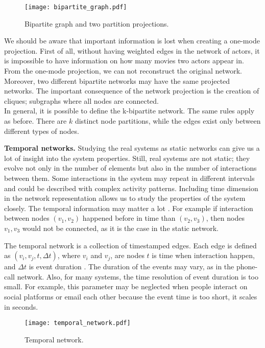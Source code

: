 \begin{figure}[H]
	\centering
	\texttt{[image: bipartite\_graph.pdf]} 
	\caption{Bipartite graph and two partition projections.}
	\label{fig:gt2}
\end{figure}

We should be aware that important information is lost when creating a one-mode projection. First of all, without having weighted edges in the network of actors, it is impossible to have information on how many movies two actors appear in. From the one-mode projection, we can not reconstruct the original network. Moreover, two different bipartite networks may have the same projected networks. The important consequence of the network projection is the creation of cliques; subgraphs where all nodes are connected. \\
In general, it is possible to define the k-bipartite network. The same rules apply as before. There are $k$ distinct node partitions, while the edges exist only between different types of nodes.

\textbf{Temporal networks.}
Studying the real systems as static networks can give us a lot of insight into the system properties. Still, real systems are not static; they evolve not only in the number of elements but also in the number of interactions between them. Some interactions in the system may repeat in different intervals and could be described with complex activity patterns. Including time dimension in the network representation allows us to study the properties of the system closely. The temporal information may matter a lot \cite{holme2012}. For example if interaction between nodes $(v_1, v_2)$ happened before in time than  $(v_2, v_3)$, then nodes $v_1, v_3$ would not be connected, as it is the case in the static network. 

The temporal network is a collection of timestamped edges. Each edge is defined as $(v_i, v_j, t, \Delta t)$, where $v_i$ and $v_j$, are nodes $t$ is time when interaction happen, and $\Delta t$ is event duration \cite{guide_temporal}. The duration of the events may vary, as in the phone-call network. Also, for many systems, the time resolution of event duration is too small. For example, this parameter may be neglected when people interact on social platforms or email each other because the event time is too short, it scales in seconds.

\begin{figure}[H]
	\centering
	\texttt{[image: temporal\_network.pdf]} 
	\caption{Temporal network. }
	\label{fig:gt3}
\end{figure}

